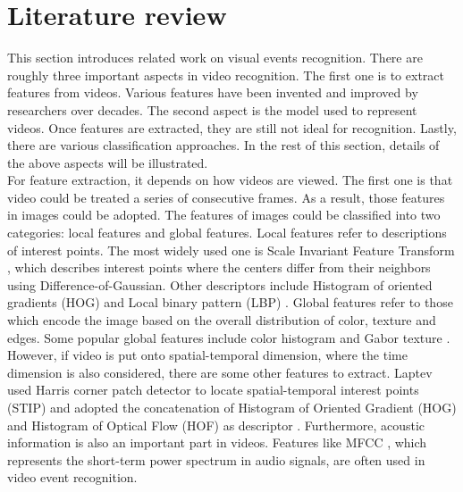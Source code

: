 \section{Literature review}
This section introduces related work on visual events recognition. There are roughly three important aspects in video recognition. The first one is to extract features from videos. Various features have been invented and improved by researchers over decades. The second aspect is the model used to represent videos. Once features are extracted, they are still not ideal for recognition. Lastly, there are various classification approaches. In the rest of this section, details of the above aspects will be illustrated.\\

\noindent For feature extraction, it depends on how videos are viewed. The first one is that video could be treated a series of consecutive frames. As a result, those features in images could be adopted. The features of images could be classified into two categories: local features and global features. Local features refer to descriptions of interest points. The most widely used one is Scale Invariant Feature Transform \cite{lowe2004distinctive}, which describes interest points where the centers differ from their neighbors using Difference-of-Gaussian. Other descriptors include Histogram of oriented gradients (HOG) \cite{dalal2005histograms} and Local binary pattern (LBP) \cite{ojala2002multiresolution}. Global features refer to those which encode the image based on the overall distribution of color, texture and edges. Some popular global features include color histogram and Gabor texture \cite{manjunath1996texture}. However, if video is put onto spatial-temporal dimension, where the time dimension is also considered, there are some other features to extract. Laptev used Harris corner patch detector \cite{lindeberg1998feature} to locate spatial-temporal interest points (STIP) and adopted the concatenation of Histogram of Oriented Gradient (HOG) and Histogram of Optical Flow (HOF) as descriptor \cite{laptev2005space}. Furthermore, acoustic information is also an important part in videos. Features like MFCC \cite{baillie2003audio}, which represents the short-term power spectrum in audio signals, are often used in video event recognition.\\

